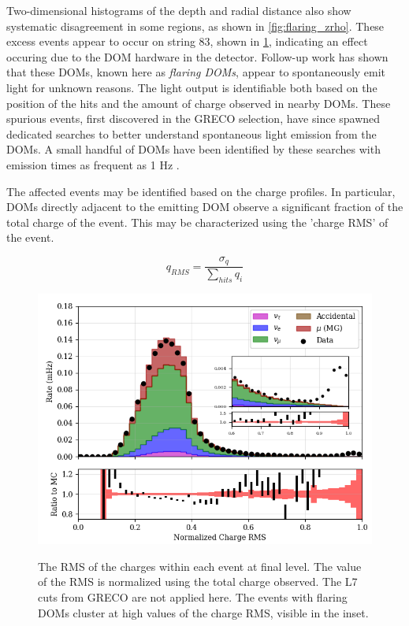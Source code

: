 Two-dimensional histograms of the depth and radial distance also show systematic disagreement in some regions, as shown in \ref{fig:flaring_zrho}.
These excess events appear to occur on string 83, shown in \ref{fig:flaring_xy}, indicating an effect occuring due to the DOM hardware in the detector.
Follow-up work has shown that these DOMs, known here as \emph{flaring DOMs}, appear to spontaneously emit light for unknown reasons. 
The light output is identifiable both based on the position of the hits and the amount of charge observed in nearby DOMs.
These spurious events, first discovered in the GRECO selection, have since spawned dedicated searches to better understand spontaneous light emission from the DOMs.
A small handful of DOMs have been identified by these searches with emission times as frequent as 1 Hz .

The affected events may be identified based on the charge profiles. 
In particular, DOMs directly adjacent to the emitting DOM observe a significant fraction of the total charge of the event.
This may be characterized using the 'charge RMS' of the event.

\label{eqn:charge_rms}
\begin{equation}
	q_{RMS} = \frac{\sigma_q}{\sum_{hits}{q_i}}
\end{equation}

\begin{center}
\begin{figure}
	\includegraphics[width=0.9\linewidth]{L7_charge_rms_normalized.png}
\label{fig:flaring_xy}
\caption{The RMS of the charges within each event at final level. The value of the RMS is normalized using the total charge observed. The L7 cuts from GRECO are not applied here. The events with flaring DOMs cluster at high values of the charge RMS, visible in the inset.}
\end{figure}
\end{center}

